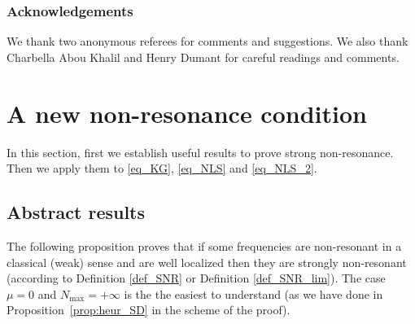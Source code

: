 \documentclass[11pt]{article}
\theoremstyle{definition}
\begin{document}
\subsubsection*{Acknowledgements}
We thank two anonymous referees for comments and suggestions. We also thank Charbella Abou Khalil and Henry Dumant for careful readings and comments.

\section{A new non-resonance condition}
\label{sec_NR}

In this section, first we establish useful results to prove strong non-resonance. Then we apply them to \eqref{eq_KG}, \eqref{eq_NLS} and \eqref{eq_NLS_2}.

\subsection{Abstract results}
The following proposition proves that if some frequencies are non-resonant in a classical (weak) sense and are well localized then they are strongly non-resonant (according to Definition \ref{def_SNR} or Definition \ref{def_SNR_lim}). The case $\mu=0$ and $N_{\max}=+\infty$ is the the easiest to understand (as we have done in Proposition~\ref{prop:heur_SD} in the scheme of the proof).
\end{document}
